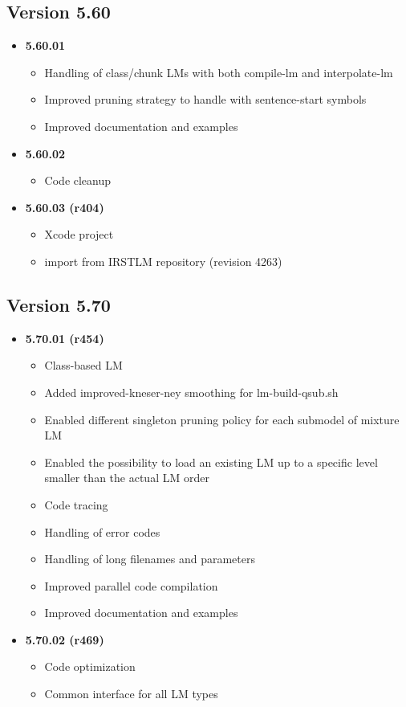 \documentclass[11pt]{article}
\begin{document}
\subsection{Version 5.60}
\begin{itemize}
\item {\bf 5.60.01}
\begin{itemize}
\item Handling of class/chunk LMs with both compile-lm and interpolate-lm
\item Improved pruning strategy to handle with sentence-start symbols
\item Improved documentation and examples
\end{itemize}
\item {\bf 5.60.02}
\begin{itemize}
\item Code cleanup 
\end{itemize}
\item {\bf 5.60.03 (r404)}
\begin{itemize}
\item Xcode project
\item import from IRSTLM repository (revision 4263)
\end{itemize}

\end{itemize}

\subsection{Version 5.70}
\begin{itemize}
\item {\bf 5.70.01 (r454)}
\begin{itemize}
\item Class-based LM
\item Added improved-kneser-ney smoothing for lm-build-qsub.sh
\item Enabled different singleton pruning policy for each submodel of mixture LM
\item Enabled the possibility to load an existing LM up to a specific level smaller than the actual LM order
\item Code tracing
\item Handling of error codes
\item Handling of long filenames and parameters
\item Improved parallel code compilation
\item Improved documentation and examples
\end{itemize}
\item {\bf 5.70.02 (r469)}
\begin{itemize}
\item Code optimization
\item Common interface for all LM types
\end{itemize}
\end{itemize}
\end{document}
